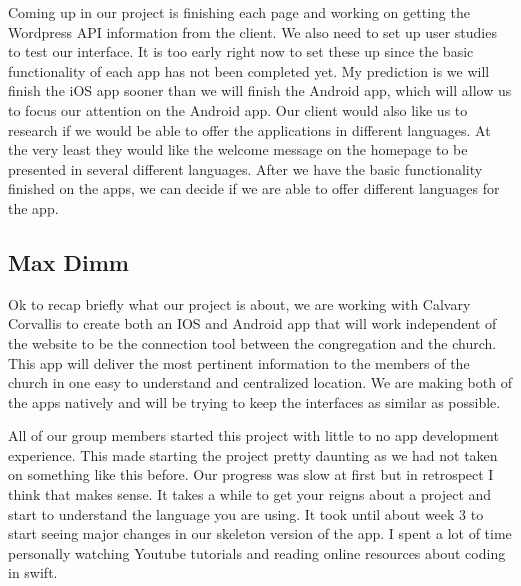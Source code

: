 \documentclass[letterpaper,10pt,draftclsnofoot,onecolumn,titlepage]{IEEEtran}
\begin{document}
	Coming up in our project is finishing each page and working on getting the Wordpress API information from the client.
	We also need to set up user studies to test our interface.
	It is too early right now to set these up since the basic functionality of each app has not been completed yet.
	My prediction is we will finish the iOS app sooner than we will finish the Android app, which will allow us to focus our attention on the Android app.
	Our client would also like us to research if we would be able to offer the applications in different languages.
	At the very least they would like the welcome message on the homepage to be presented in several different languages.
	After we have the basic functionality finished on the apps, we can decide if we are able to offer different languages for the app.


	\subsection{Max Dimm}
	Ok to recap briefly what our project is about, we are working with Calvary Corvallis to create both an IOS and Android app that will work independent of the website to be the connection tool between the congregation and the church.
	This app will deliver the most pertinent information to the members of the church in one easy to understand and centralized location. We are making both of the apps natively and will be trying to keep the interfaces as similar as possible.

	All of our group members started this project with little to no app development experience.
	This made starting the project pretty daunting as we had not taken on something like this before. Our progress was slow at first but in retrospect I think that makes sense.
	It takes a while to get your reigns about a project and start to understand the language you are using.
	It took until about week 3 to start seeing major changes in our skeleton version of the app.
	I spent a lot of time personally watching Youtube tutorials and reading online resources about coding in swift.
\end{document}
